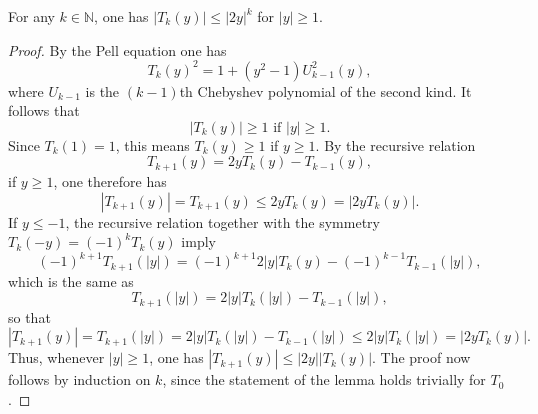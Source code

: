 \documentclass[10pt,a4paper]{amsart}
\newcommand{\N}{\mathbb{N}}
\begin{document}
\begin{lemma}
    For any $k \in \N$, one has $|T_k(y)| \leq |2y|^k$ for $|y|\geq 1$.
\end{lemma}

\begin{proof}
    By the Pell equation one has
\[
T_k(y)^2 = 1+ (y^2-1)U^2_{k-1}(y),
\]
where $U_{k-1}$ is the $(k-1)$th Chebyshev polynomial of the second kind. It follows that
\[
|T_k(y)| \ge 1 \mbox{ if } |y| \geq 1.
\]
Since $T_k(1)=1$, this means $T_k(y) \ge 1$ if $y \ge 1$.
By the recursive relation
\[
T_{k+1}(y) = 2yT_k(y) - T_{k-1}(y),
\]
if $y\geq 1$, one therefore  has
\[
    |T_{k+1}(y)| = T_{k+1}(y)\le 2yT_k(y) = |2yT_k(y)|.
\]
If $y \le -1$, the recursive relation together with the symmetry $T_k(-y) = (-1)^kT_k(y)$ imply
\[
(-1)^{k+1}T_{k+1}(|y|) = (-1)^{k+1}2|y|T_k(y) - (-1)^{k-1}T_{k-1}(|y|),
\]
which is the same as
\[
T_{k+1}(|y|) = 2|y|T_k(|y|) - T_{k-1}(|y|),
\]
so that
\[
|T_{k+1}(y)| = T_{k+1}(|y|) = 2|y|T_k(|y|) - T_{k-1}(|y|) \le 2|y|T_k(|y|) = |2yT_k(y)|.
\]
Thus, whenever $|y| \ge 1$, one has $|T_{k+1}(y)| \le |2y||T_k(y)|$.
The proof now follows by induction on $k$, since the statement of the lemma holds trivially for $T_0$.
\end{proof}
\end{document}
